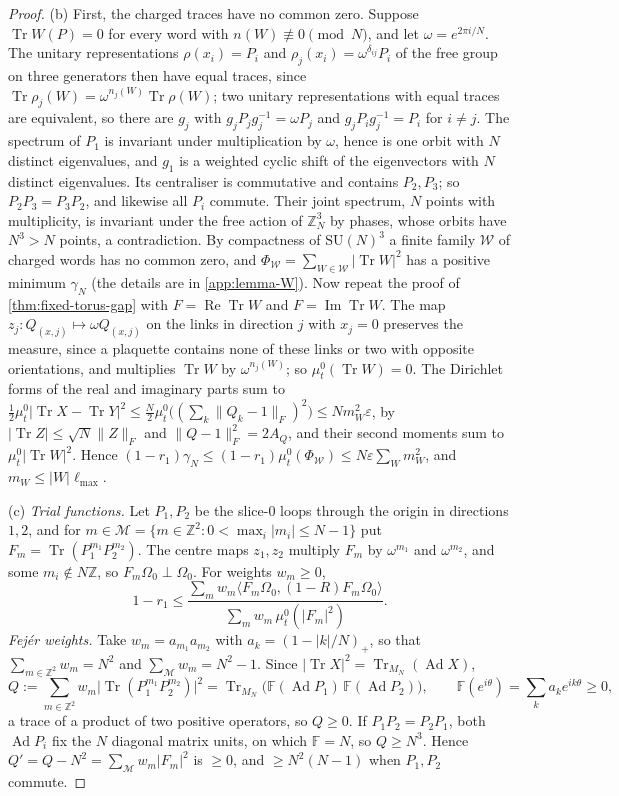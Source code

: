 \documentclass[11pt,a4paper]{amsart}
\theoremstyle{definition}
\theoremstyle{remark}
\numberwithin{equation}{section}
\DeclareMathOperator{\Tr}{Tr}        %
\newcommand{\Z}{\mathbb{Z}}          %
\newcommand{\ip}[2]{\langle #1,#2\rangle}  %
\newcommand{\norm}[1]{\lVert #1\rVert}     %
\newcommand{\abs}[1]{\lvert #1\rvert}      %
\newcommand{\SU}{\mathrm{SU}}              %
\newcommand{\Omegazero}{\Omega_0}          %
\begin{document}
\begin{proof}
(b) First, the charged traces have no common zero. Suppose $\Tr W(P)=0$ for every word with $n(W)\not\equiv0\pmod N$, and let $\omega=e^{2\pi i/N}$. The unitary representations $\rho(x_i)=P_i$ and $\rho_j(x_i)=\omega^{\delta_{ij}}P_i$ of the free group on three generators then have equal traces, since $\Tr\rho_j(W)=\omega^{n_j(W)}\Tr\rho(W)$; two unitary representations with equal traces are equivalent, so there are $g_j$ with $g_jP_jg_j^{-1}=\omega P_j$ and $g_jP_ig_j^{-1}=P_i$ for $i\ne j$. The spectrum of $P_1$ is invariant under multiplication by $\omega$, hence is one orbit with $N$ distinct eigenvalues, and $g_1$ is a weighted cyclic shift of the eigenvectors with $N$ distinct eigenvalues. Its centraliser is commutative and contains $P_2,P_3$; so $P_2P_3=P_3P_2$, and likewise all $P_i$ commute. Their joint spectrum, $N$ points with multiplicity, is invariant under the free action of $\Z_N^3$ by phases, whose orbits have $N^3>N$ points, a contradiction. By compactness of $\SU(N)^3$ a finite family $\mathcal W$ of charged words has no common zero, and $\Phi_{\mathcal W}=\sum_{W\in\mathcal W}\abs{\Tr W}^2$ has a positive minimum $\gamma_N$ (the details are in \cref{app:lemma-W}). Now repeat the proof of \cref{thm:fixed-torus-gap} with $F=\operatorname{Re}\Tr W$ and $F=\operatorname{Im}\Tr W$. The map $z_j\colon Q_{(x,j)}\mapsto\omega Q_{(x,j)}$ on the links in direction $j$ with $x_j=0$ preserves the measure, since a plaquette contains none of these links or two with opposite orientations, and multiplies $\Tr W$ by $\omega^{n_j(W)}$; so $\mu^0_t(\Tr W)=0$. The Dirichlet forms of the real and imaginary parts sum to $\frac12\mu^0_t\abs{\Tr X-\Tr Y}^2\le\frac N2\mu^0_t\bigl((\sum_k\norm{Q_k-1}_F)^2\bigr)\le Nm_W^2\varepsilon$, by $\abs{\Tr Z}\le\sqrt N\norm Z_F$ and $\norm{Q-1}_F^2=2A_Q$, and their second moments sum to $\mu^0_t\abs{\Tr W}^2$. Hence $(1-r_1)\gamma_N\le(1-r_1)\mu^0_t(\Phi_{\mathcal W})\le N\varepsilon\sum_Wm_W^2$, and $m_W\le\abs W\ell_{\max}$.

(c) \emph{Trial functions.} Let $P_1,P_2$ be the slice-$0$ loops through the origin in directions $1,2$, and for $m\in\mathcal M=\{m\in\Z^2:0<\max_i\abs{m_i}\le N-1\}$ put $F_m=\Tr(P_1^{m_1}P_2^{m_2})$. The centre maps $z_1,z_2$ multiply $F_m$ by $\omega^{m_1}$ and $\omega^{m_2}$, and some $m_i\notin N\Z$, so $F_m\Omegazero\perp\Omegazero$. For weights $w_m\ge0$,
\[
1-r_1\le\frac{\sum_mw_m\ip{F_m\Omegazero}{(1-R)F_m\Omegazero}}{\sum_mw_m\,\mu^0_t(\abs{F_m}^2)} .
\]
\emph{Fej\'er weights.} Take $w_m=a_{m_1}a_{m_2}$ with $a_k=(1-\abs k/N)_+$, so that $\sum_{m\in\Z^2}w_m=N^2$ and $\sum_{\mathcal M}w_m=N^2-1$. Since $\abs{\Tr X}^2=\Tr_{M_N}(\operatorname{Ad}X)$,
\[
Q:=\sum_{m\in\Z^2}w_m\abs{\Tr(P_1^{m_1}P_2^{m_2})}^2=\Tr_{M_N}\bigl(\mathbb F(\operatorname{Ad}P_1)\,\mathbb F(\operatorname{Ad}P_2)\bigr),\qquad\mathbb F(e^{i\theta})=\sum_ka_ke^{ik\theta}\ge0,
\]
a trace of a product of two positive operators, so $Q\ge0$. If $P_1P_2=P_2P_1$, both $\operatorname{Ad}P_i$ fix the $N$ diagonal matrix units, on which $\mathbb F=N$, so $Q\ge N^3$. Hence $Q'=Q-N^2=\sum_{\mathcal M}w_m\abs{F_m}^2$ is $\ge0$, and $\ge N^2(N-1)$ when $P_1,P_2$ commute.


\end{proof}
\end{document}
